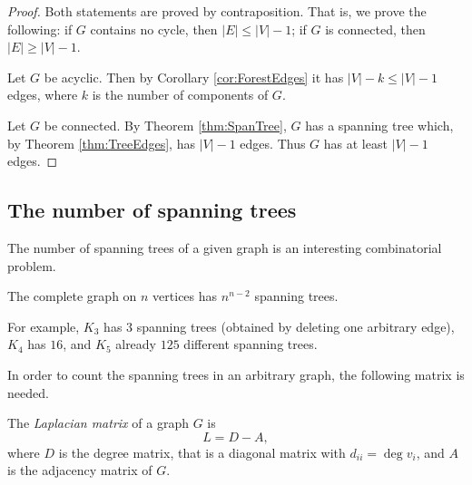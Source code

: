 \begin{page}

\begin{proof}
Both statements are proved by contraposition.
That is, we prove the following: if $G$ contains no cycle, then $|E| \le |V| - 1$; if $G$ is connected, then $|E| \ge |V| - 1$.

Let $G$ be acyclic.
Then by Corollary \ref{cor:ForestEdges} it has $|V| - k \le |V| - 1$ edges, where $k$ is the number of components of $G$.

Let $G$ be connected.
By Theorem \ref{thm:SpanTree}, $G$ has a spanning tree which, by Theorem \ref{thm:TreeEdges}, has $|V| - 1$ edges.
Thus $G$ has at least $|V| - 1$ edges.
\end{proof}





\end{page}

\begin{page}

\subsection{The number of spanning trees}
The number of spanning trees of a given graph is an interesting combinatorial problem.


\end{page}

\begin{page}

\begin{thm}
The complete graph on $n$ vertices has $n^{n-2}$ spanning trees.
\end{thm}

\end{page}

\begin{page}

For example, $K_3$ has $3$ spanning trees (obtained by deleting one arbitrary edge),
$K_4$ has $16$, and $K_5$ already $125$ different spanning trees.

In order to count the spanning trees in an arbitrary graph, the following matrix is needed.

\end{page}

\begin{page}

\begin{dfn}
The \emph{Laplacian matrix} of a graph $G$ is
\[
L = D - A,
\]
where $D$ is the degree matrix, that is a diagonal matrix with $d_{ii} = \deg v_i$, and $A$ is the adjacency matrix of $G$.
\end{dfn}

\end{page}


